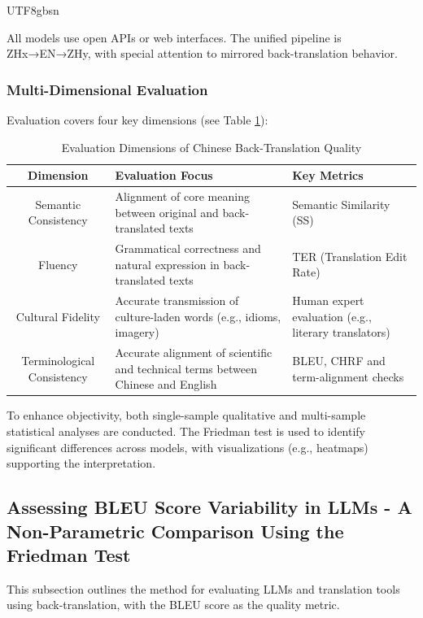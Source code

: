 \documentclass[conference]{IEEEtran}
\begin{document}
\begin{CJK}{UTF8}{gbsn}
\begin{itemize}
\end{itemize}

All models use open APIs or web interfaces. The unified pipeline is ZHx→EN→ZHy, with special attention to mirrored back-translation behavior.

 \subsubsection{Multi-Dimensional Evaluation}
Evaluation covers four key dimensions (see Table \ref{tab: methodology}):

\begin{table}[htbp]
\centering
\caption{Evaluation Dimensions of Chinese Back-Translation Quality}
\begin{tabular}{c|p{5cm}|p{5cm}}
\hline
\textbf{Dimension} & \textbf{Evaluation Focus} & \textbf{Key Metrics} \\
\hline
Semantic Consistency & Alignment of core meaning between original and back-translated texts & Semantic Similarity (SS) \\
\hline
Fluency & Grammatical correctness and natural expression in back-translated texts & TER (Translation Edit Rate) \\
\hline
Cultural Fidelity & Accurate transmission of culture-laden words (e.g., idioms, imagery) & Human expert evaluation (e.g., literary translators) \\
\hline
Terminological Consistency & Accurate alignment of scientific and technical terms between Chinese and English & BLEU, CHRF and term-alignment checks \\
\hline
\end{tabular}
\label{tab: methodology}
\end{table}


To enhance objectivity, both single-sample qualitative and multi-sample statistical analyses are conducted. The Friedman test \citep{demvsar2006statistical} is used to identify significant differences across models, with visualizations (e.g., heatmaps) supporting the interpretation.


\subsection{Assessing BLEU Score Variability in LLMs - A Non-Parametric Comparison Using the Friedman Test}

This subsection outlines the method for evaluating LLMs and translation tools using back-translation, with the BLEU score as the quality metric.


\end{CJK}
\end{document}
